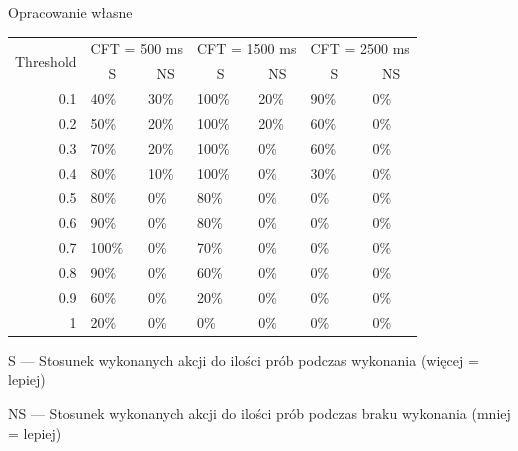 \documentclass[skorowidz,skroty]{dyplomWEZUT}
\begin{document}
{Opracowanie własne}
{
    \begin{threeparttable}
        \begin{tabularx}{.95\linewidth}{r|X|X|X|X|X|X}
            \multicolumn{1}{c|}{\multirow{2}{*}{Threshold}} & \multicolumn{2}{c|}{CFT = 500 ms} & \multicolumn{2}{c|}{CFT = 1500 ms} & \multicolumn{2}{c}{CFT = 2500 ms} \\ \cline{2-7} 
            \multicolumn{1}{c|}{} & \multicolumn{1}{c|}{S} & \multicolumn{1}{c|}{NS} & \multicolumn{1}{c|}{S} & \multicolumn{1}{c|}{NS} & \multicolumn{1}{c|}{S} & \multicolumn{1}{c}{NS} \\ \hline\hline
            0.1 & 40\% & 30\% & 100\% & 20\% & 90\% & 0\% \\ \hline
            0.2 & 50\% & 20\% & 100\% & 20\% & 60\% & 0\% \\ \hline
            0.3 & 70\% & 20\% & 100\% & 0\% & 60\% & 0\% \\ \hline
            0.4 & 80\% & 10\% & 100\% & 0\% & 30\% & 0\% \\ \hline
            0.5 & 80\% & 0\% & 80\% & 0\% & 0\% & 0\% \\ \hline
            0.6 & 90\% & 0\% & 80\% & 0\% & 0\% & 0\% \\ \hline
            0.7 & 100\% & 0\% & 70\% & 0\% & 0\% & 0\% \\ \hline
            0.8 & 90\% & 0\% & 60\% & 0\% & 0\% & 0\% \\ \hline
            0.9 & 60\% & 0\% & 20\% & 0\% & 0\% & 0\% \\ \hline
            1 & 20\% & 0\% & 0\% & 0\% & 0\% & 0\% \\
        \end{tabularx}
        \begin{tablenotes}
            \item \hphantom{N}S --- Stosunek wykonanych akcji do ilości prób podczas wykonania (więcej = lepiej)
            \item NS --- Stosunek wykonanych akcji do ilości prób podczas braku wykonania (mniej = lepiej)
        \end{tablenotes}
    \end{threeparttable}
}
\end{document}
